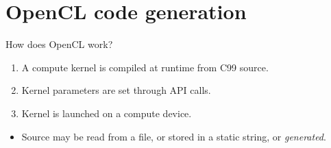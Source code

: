 \documentclass[@BEAMER_OPTIONS@]{beamer}
\begin{document}
\section{OpenCL code generation}

\begin{frame}{}
    \tableofcontents[currentsection]
\end{frame}

\note{ }

\begin{frame}{How does OpenCL work?}
    \begin{enumerate}
        \item A compute kernel is compiled at runtime from C99 source.
        \item Kernel parameters are set through API calls.
        \item Kernel is launched on a compute device.
    \end{enumerate}
    \vspace{\baselineskip}
    \pause
    \begin{itemize}
        \item Source may be read from a file, or stored in a static
            string, or \alert{\emph{generated}}.
    \end{itemize}
\end{frame}

\note{ }
\end{document}
